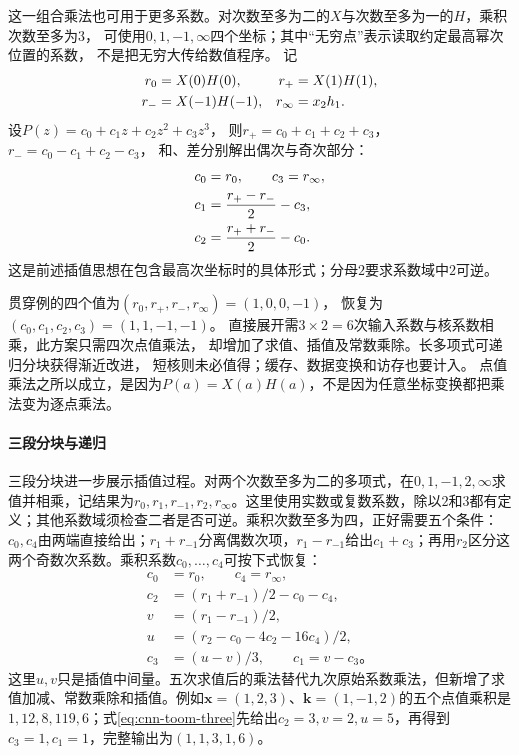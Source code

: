 这一组合乘法也可用于更多系数。对次数至多为二的$X$与次数至多为一的$H$，乘积次数至多为$3$，
可使用$0,1,-1,\infty$四个坐标；其中“无穷点”表示读取约定最高幂次位置的系数，
不是把无穷大传给数值程序。
记
\begin{align}
  r_0&=X(0)H(0),&r_+&=X(1)H(1),\notag\\
  r_-&=X(-1)H(-1),&r_\infty&=x_2h_1.\label{eq:cnn-toom-three-two-evaluation}
\end{align}
设$P(z)=c_0+c_1z+c_2z^2+c_3z^3$，
则$r_+=c_0+c_1+c_2+c_3$，$r_-=c_0-c_1+c_2-c_3$，
和、差分别解出偶次与奇次部分：
\begin{align}
  c_0&=r_0,\qquad c_3=r_\infty,\notag\\
  c_1&=\frac{r_+-r_-}{2}-c_3,\notag\\
  c_2&=\frac{r_++r_-}{2}-c_0.
  \label{eq:signal-analysis-toom-reconstruction}
\end{align}
\BookEquationAliases{\label{eq:cnn-toom-three-two-recovery}}
这是前述插值思想在包含最高次坐标时的具体形式；分母$2$要求系数域中$2$可逆。

贯穿例的四个值为$(r_0,r_+,r_-,r_\infty)=(1,0,0,-1)$，
恢复为$(c_0,c_1,c_2,c_3)=(1,1,-1,-1)$。
直接展开需$3\times2=6$次输入系数与核系数相乘，此方案只需四次点值乘法，
却增加了求值、插值及常数乘除。长多项式可递归分块获得渐近改进，
短核则未必值得；缓存、数据变换和访存也要计入。
点值乘法之所以成立，是因为$P(a)=X(a)H(a)$，不是因为任意坐标变换都把乘法变为逐点乘法。

\paragraph{三段分块与递归}

三段分块进一步展示插值过程。对两个次数至多为二的多项式，在$0,1,-1,2,\infty$求值并相乘，记结果为$r_0,r_1,r_{-1},r_2,r_\infty$。这里使用实数或复数系数，除以$2$和$3$都有定义；其他系数域须检查二者是否可逆。乘积次数至多为四，正好需要五个条件：$c_0,c_4$由两端直接给出；$r_1+r_{-1}$分离偶数次项，$r_1-r_{-1}$给出$c_1+c_3$；再用$r_2$区分这两个奇数次系数。乘积系数$c_0,\ldots,c_4$可按下式恢复：
\begin{equation}
  \begin{aligned}
    c_0&=r_0,\qquad c_4=r_\infty,\\
    c_2&=(r_1+r_{-1})/2-c_0-c_4,\\
    v&=(r_1-r_{-1})/2,\\
    u&=(r_2-c_0-4c_2-16c_4)/2,\\
    c_3&=(u-v)/3,\qquad c_1=v-c_3\text{。}
  \end{aligned}
  \label{eq:cnn-toom-three}
\end{equation}
这里$u,v$只是插值中间量。五次求值后的乘法替代九次原始系数乘法，但新增了求值加减、常数乘除和插值。例如$\bm x=(1,2,3)$、$\bm k=(1,-1,2)$的五个点值乘积是$1,12,8,119,6$；式\eqref{eq:cnn-toom-three}先给出$c_2=3,v=2,u=5$，再得到$c_3=1,c_1=1$，完整输出为$(1,1,3,1,6)$。

